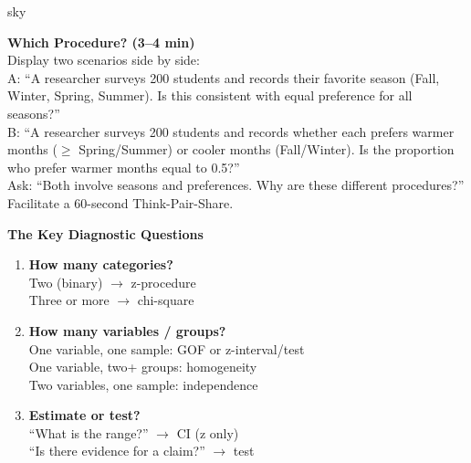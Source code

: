 \documentclass[10pt]{article}
\begin{document}
\begin{skillbox}[Hook]{sky}
\begin{minipage}[t]{0.55\linewidth}
    \textbf{Which Procedure? (3--4 min)}\\
    Display two scenarios side by side:\\[4pt]
    A: ``A researcher surveys 200 students and records their favorite season (Fall, Winter,
    Spring, Summer). Is this consistent with equal preference for all seasons?''\\[4pt]
    B: ``A researcher surveys 200 students and records whether each prefers warmer months
    ($\ge$ Spring/Summer) or cooler months (Fall/Winter). Is the proportion who prefer
    warmer months equal to 0.5?''\\[4pt]
    Ask: ``Both involve seasons and preferences. Why are these different procedures?''
    Facilitate a 60-second Think-Pair-Share.
\end{minipage}
\hfill
\begin{minipage}[t]{0.40\linewidth}
    \textbf{The Key Diagnostic Questions}
    \begin{enumerate}
        \item \textbf{How many categories?}\\
              Two (binary) $\to$ z-procedure\\
              Three or more $\to$ chi-square
        \item \textbf{How many variables / groups?}\\
              One variable, one sample: GOF or z-interval/test\\
              One variable, two+ groups: homogeneity\\
              Two variables, one sample: independence
        \item \textbf{Estimate or test?}\\
              ``What is the range?'' $\to$ CI (z only)\\
              ``Is there evidence for a claim?'' $\to$ test
    \end{enumerate}
\end{minipage}
\end{skillbox}
\end{document}
